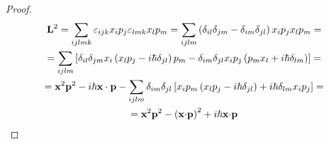 \documentclass{tstextbook}
\begin{document}
\begin{proof}
$$\begin{gather}{\bf L}^{2}=\sum_{i j l m k}\varepsilon_{i j k}x_{i}p_{j}\varepsilon_{l m k}x_{l}p_{m}=\sum_{i j l m}\left( \delta_{i l}\delta_{j m}-\delta_{i m}\delta_{j l} \right)x_{i}p_{j}x_{l}p_{m}=\\=\sum_{i j l m}\left[ \delta_{i l}\delta_{j m}x_{i}\left( x_{l}p_{j}-i\hbar\delta_{j l} \right)p_{m}-\delta_{i m}\delta_{j l}x_{i}p_{j}\left( p_{m}x_{l}+i\hbar\delta_{l m} \right) \right]=\\={\bf x}^{2}{\bf p}^{2}-i\hbar{\bf x}\cdot{\bf p}-\sum_{i j l m}\delta_{i m}\delta_{j l}\left[ x_{i}p_{m}\left( x_{l}p_{j}-i\hbar\delta_{j l} \right)+i\hbar\delta_{l m}x_{i}p_{j} \right]= \\=\mathbf{x}^{2}\mathbf{p}^{2}-\left(\mathbf{x}{\cdot}\mathbf{p}\right)^{2}+i\hbar\mathbf{x}{\cdot}\mathbf{p}
\end{gather}$$

\end{proof}
\end{document}

